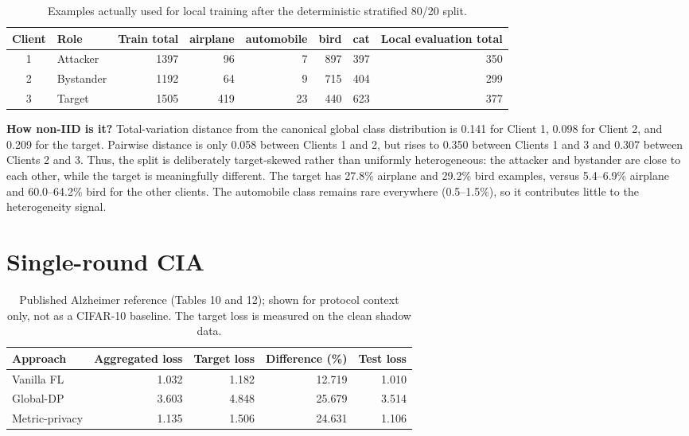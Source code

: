 \documentclass[10pt]{article}
\begin{document}
\begin{table}[h]
\centering
\caption{Examples actually used for local training after the deterministic stratified 80/20 split.}
\begin{tabular}{clrrrrrr}
\toprule
Client & Role & Train total & airplane & automobile & bird & cat & Local evaluation total \\
\midrule
1 & Attacker & 1397 & 96 & 7 & 897 & 397 & 350 \\
2 & Bystander & 1192 & 64 & 9 & 715 & 404 & 299 \\
3 & Target & 1505 & 419 & 23 & 440 & 623 & 377 \\
\bottomrule
\end{tabular}
\end{table}

\textbf{How non-IID is it?} Total-variation distance from the canonical global class distribution is
0.141 for Client 1, 0.098 for Client 2, and 0.209 for the target.
Pairwise distance is only 0.058 between Clients 1 and 2, but rises to
0.350 between Clients 1 and 3 and 0.307 between Clients 2 and 3.
Thus, the split is deliberately target-skewed rather than uniformly heterogeneous: the attacker and
bystander are close to each other, while the target is meaningfully different. The target has 27.8\% airplane
and 29.2\% bird examples, versus 5.4--6.9\% airplane and 60.0--64.2\% bird for the other clients.
The automobile class remains rare everywhere (0.5--1.5\%), so it contributes little to the heterogeneity signal.

\section*{Single-round CIA}

\begin{table}[h]
\centering
\caption{Published Alzheimer reference (Tables 10 and 12); shown for protocol context only, not as a CIFAR-10 baseline. The target loss is measured on the clean shadow data.}
\begin{tabular}{lrrrr}
\toprule
Approach & Aggregated loss & Target loss & Difference (\%) & Test loss \\
\midrule
Vanilla FL & 1.032 & 1.182 & 12.719 & 1.010 \\
Global-DP & 3.603 & 4.848 & 25.679 & 3.514 \\
Metric-privacy & 1.135 & 1.506 & 24.631 & 1.106 \\
\bottomrule
\end{tabular}
\end{table}
\end{document}
